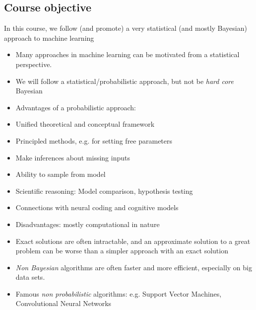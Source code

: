 \subsection{Course objective}
In this course, we follow (and promote) a very statistical (and mostly Bayesian) approach to machine learning
\begin{itemize}
	\item Many approaches in machine learning can be motivated from a statistical perspective.
	\item We will follow a statistical/probabilistic approach, but not be \textit{hard core} Bayesian
	\item Advantages of a probabilistic approach:
	\item Unified theoretical and conceptual framework
	\item Principled methods, e.g. for setting free parameters
	\item Make inferences about missing inputs
	\item Ability to sample from model
	\item Scientific reasoning: Model comparison, hypothesis testing
	\item Connections with neural coding and cognitive models
	\item Disadvantages: mostly computational in nature
	\item Exact solutions are often intractable, and an approximate solution to a great problem can be worse than a simpler approach with an exact solution
	\item \textit{Non Bayesian} algorithms are often faster and more efficient, especially on big data sets.
	\item Famous \textit{non probabilistic} algorithms: e.g. Support Vector Machines, Convolutional Neural Networks
\end{itemize}
